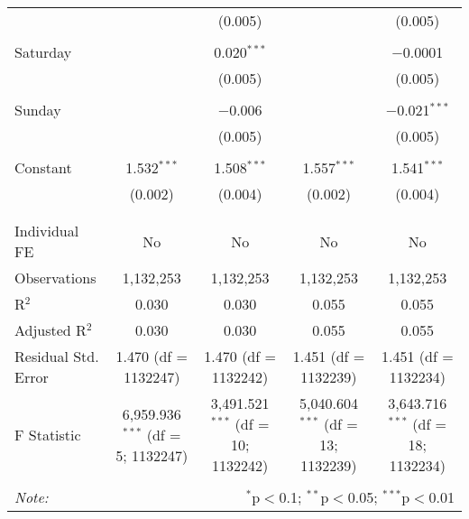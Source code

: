 \documentclass[
]{article}
\begin{document}
\begin{table}[!htbp]
{\begin{tabular}{@{\extracolsep{5pt}}lcccc}
  &  & (0.005) &  & (0.005) \\ 
  & & & & \\ 
 Saturday &  & 0.020$^{***}$ &  & $-$0.0001 \\ 
  &  & (0.005) &  & (0.005) \\ 
  & & & & \\ 
 Sunday &  & $-$0.006 &  & $-$0.021$^{***}$ \\ 
  &  & (0.005) &  & (0.005) \\ 
  & & & & \\ 
 Constant & 1.532$^{***}$ & 1.508$^{***}$ & 1.557$^{***}$ & 1.541$^{***}$ \\ 
  & (0.002) & (0.004) & (0.002) & (0.004) \\ 
  & & & & \\ 
\hline \\[-1.8ex] 
Individual FE & No & No & No & No \\ 
Observations & 1,132,253 & 1,132,253 & 1,132,253 & 1,132,253 \\ 
R$^{2}$ & 0.030 & 0.030 & 0.055 & 0.055 \\ 
Adjusted R$^{2}$ & 0.030 & 0.030 & 0.055 & 0.055 \\ 
Residual Std. Error & 1.470 (df = 1132247) & 1.470 (df = 1132242) & 1.451 (df = 1132239) & 1.451 (df = 1132234) \\ 
F Statistic & 6,959.936$^{***}$ (df = 5; 1132247) & 3,491.521$^{***}$ (df = 10; 1132242) & 5,040.604$^{***}$ (df = 13; 1132239) & 3,643.716$^{***}$ (df = 18; 1132234) \\ 
\hline 
\hline \\[-1.8ex] 
\textit{Note:}  & \multicolumn{4}{r}{$^{*}$p$<$0.1; $^{**}$p$<$0.05; $^{***}$p$<$0.01} \\ 
\end{tabular}
} 
\end{table} 
\newpage
\end{document}
